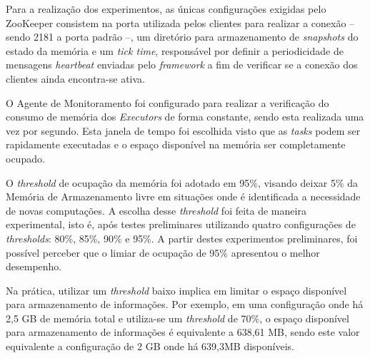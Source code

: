 \begin{table}[!ht]
    \caption{Configuração de Memória Utilizada - Gerenciamento Dinâmico}
    \label{tab:memoria-arq-dinamica}
    \centering
\end{table}

Para a realização dos experimentos, as únicas configurações exigidas pelo ZooKeeper consistem na porta utilizada pelos clientes para realizar a conexão -- sendo 2181 a porta padrão --, um diretório para armazenamento de \textit{snapshots} do estado da memória e um \textit{tick time}, responsável por definir a periodicidade de mensagens \textit{heartbeat} enviadas pelo \textit{framework} a fim de verificar se a conexão dos clientes ainda encontra-se ativa.

O Agente de Monitoramento foi configurado para realizar a verificação do consumo de memória dos \textit{Executors} de forma constante, sendo esta realizada uma vez por segundo. Esta janela de tempo foi escolhida visto que as \textit{tasks} podem ser rapidamente executadas e o espaço disponível na memória ser completamente ocupado.

O \textit{threshold} de ocupação da memória foi adotado em 95\%, visando deixar 5\% da Memória de Armazenamento livre em situações onde é identificada a necessidade de novas computações. A escolha desse \textit{threshold} foi feita de maneira experimental, isto é, após testes preliminares utilizando quatro configurações de \textit{thresholds}: 80\%, 85\%, 90\% e 95\%. A partir destes experimentos preliminares, foi possível perceber que o limiar de ocupação de 95\% apresentou o melhor desempenho.

Na prática, utilizar um \textit{threshold} baixo implica em limitar o espaço disponível para armazenamento de informações. Por exemplo, em uma configuração onde há 2,5 GB de memória total e utiliza-se um \textit{threshold} de 70\%, o espaço disponível para armazenamento de informações é equivalente a 638,61 MB, sendo este valor equivalente a configuração de 2 GB onde há 639,3MB disponíveis.



